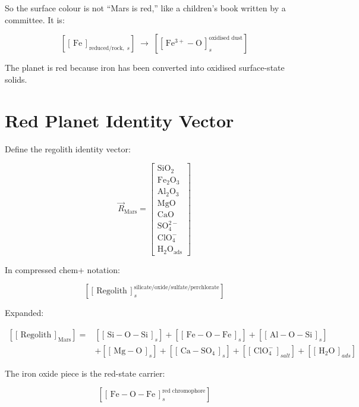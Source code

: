 \documentclass[11pt,a4paper]{article}
\newcommand{\cid}[3]{\!\left[\!\left[\,#1\,\right]^{\!#2}_{\!#3}\!\right]}
\newcommand{\cidb}[2]{\!\left[\!\left[\,#1\,\right]_{\!#2}\!\right]}
\newcommand{\Rmars}{\vec{R}_{\mathrm{Mars}}}   %
\begin{document}
So the surface colour is not ``Mars is red,'' like a children's book written
by a committee.  It is:

\begin{keybox}
\[
\cidb{\mathrm{Fe}}{\text{reduced/rock},\;s}
\;\rightarrow\;
\cid{\mathrm{Fe^{3+}{-}O}}{\text{oxidised dust}}{s}
\]
\end{keybox}

The planet is red because iron has been converted into oxidised surface-state
solids.

\section{Red Planet Identity Vector}

Define the regolith identity vector:

\[
\Rmars
=
\begin{bmatrix}
\mathrm{SiO_2}\\[2pt]
\mathrm{Fe_2O_3}\\[2pt]
\mathrm{Al_2O_3}\\[2pt]
\mathrm{MgO}\\[2pt]
\mathrm{CaO}\\[2pt]
\mathrm{SO_4^{2-}}\\[2pt]
\mathrm{ClO_4^-}\\[2pt]
\mathrm{H_2O_{ads}}
\end{bmatrix}
\]

In compressed chem+ notation:

\[
\cid{\mathrm{Regolith}}
	{\mathrm{silicate/oxide/sulfate/perchlorate}}
	{s}
\]

Expanded:

\begin{align*}
\cidb{\mathrm{Regolith}}{\mathrm{Mars}}
={}&
  \cidb{\mathrm{Si{-}O{-}Si}}{s}
  +\cidb{\mathrm{Fe{-}O{-}Fe}}{s}
  +\cidb{\mathrm{Al{-}O{-}Si}}{s}\\
&+\cidb{\mathrm{Mg{-}O}}{s}
  +\cidb{\mathrm{Ca{-}SO_4}}{s}
  +\cidb{\mathrm{ClO_4^-}}{salt}
  +\cidb{\mathrm{H_2O}}{ads}
\end{align*}

The iron oxide piece is the red-state carrier:

\begin{keybox}
\[
\cid{\mathrm{Fe{-}O{-}Fe}}{\text{red chromophore}}{s}
\]
\end{keybox}
\end{document}

